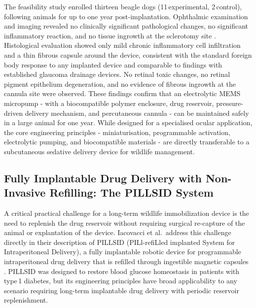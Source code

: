 \documentclass[12pt,a4paper]{article}
\begin{document}
    The feasibility study enrolled thirteen beagle dogs (11\,experimental, 2\,control), following
    animals for up to one year post-implantation. Ophthalmic examination and imaging revealed
    no clinically significant pathological changes, no significant inflammatory reaction, and no
    tissue ingrowth at the sclerotomy site \cite{gutierrez2014}. Histological evaluation showed
    only mild chronic inflammatory cell infiltration and a thin fibrous capsule around the device,
    consistent with the standard foreign body response to any implanted device and comparable
    to findings with established glaucoma drainage devices. No retinal toxic changes, no retinal
    pigment epithelium degeneration, and no evidence of fibrous ingrowth at the cannula site
    were observed. These findings confirm that an electrolytic MEMS micropump - with a
    biocompatible polymer enclosure, drug reservoir, pressure-driven delivery mechanism, and
    percutaneous cannula - can be maintained safely in a large animal for one year. While
    designed for a specialised ocular application, the core engineering principles -
    miniaturisation, programmable activation, electrolytic pumping, and biocompatible materials
    - are directly transferable to a subcutaneous sedative delivery device for wildlife
    management.

    \subsection{Fully Implantable Drug Delivery with Non-Invasive Refilling: The PILLSID System}

    A critical practical challenge for a long-term wildlife immobilization device is the need to
    replenish the drug reservoir without requiring surgical re-capture of the animal or
    explantation of the device. Iacovacci et al.\ address this challenge directly in their
    description of PILLSID (PILl-refiLled implanted System for Intraperitoneal Delivery), a
    fully implantable robotic device for programmable intraperitoneal drug delivery that is
    refilled through ingestible magnetic capsules \cite{iacovacci2021}. PILLSID was designed to
    restore blood glucose homeostasis in patients with type\,1 diabetes, but its engineering
    principles have broad applicability to any scenario requiring long-term implantable drug
    delivery with periodic reservoir replenishment.
\end{document}
